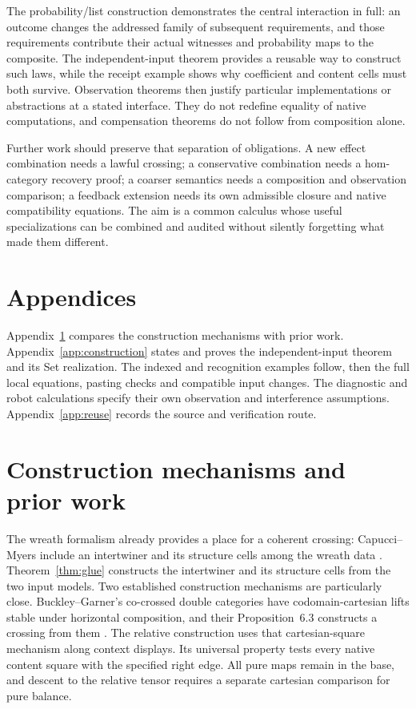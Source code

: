 \documentclass[11pt]{article}
\numberwithin{equation}{section}
\theoremstyle{definition}\newtheorem{definition}[theorem]{Definition}
\begin{document}
The probability/list construction demonstrates the central interaction in
full: an outcome changes the addressed family of subsequent requirements,
and those requirements contribute their actual witnesses and probability
maps to the composite. The independent-input theorem provides a reusable
way to construct such laws, while the receipt example shows why coefficient
and content cells must both survive. Observation theorems then justify
particular implementations or abstractions at a stated interface. They do
not redefine equality of native computations, and compensation theorems do
not follow from composition alone.

Further work should preserve that separation of obligations. A new effect
combination needs a lawful crossing; a conservative combination needs a
hom-category recovery proof; a coarser semantics needs a composition and
observation comparison; a feedback extension needs its own admissible
closure and native compatibility equations.
The aim is a common calculus whose useful specializations can be combined
and audited without silently forgetting what made them different.

\appendix
\section*{Appendices}
Appendix~\ref{app:credit} compares the construction mechanisms with prior work. Appendix~\ref{app:construction} states and proves the independent-input theorem and its Set realization. The indexed and recognition examples follow, then the full local equations, pasting checks and compatible input changes. The diagnostic and robot calculations specify their own observation and interference assumptions. Appendix~\ref{app:reuse} records the source and verification route.

\section{Construction mechanisms and prior work}\label{app:credit}
The wreath formalism already provides a place for a coherent crossing:
Capucci--Myers include an intertwiner and its structure cells among the
wreath data \cite[Def.~D.9]{CM}. Theorem~\ref{thm:glue} constructs the intertwiner and its structure cells
from the two input models. Two
established construction mechanisms are particularly close. Buckley--Garner's
co-crossed double categories have codomain-cartesian lifts stable under
horizontal composition, and their Proposition~6.3 constructs a crossing
from them \cite[Def.~6.1, Prop.~6.3 and Rem.~9.5]{BG}. The relative
construction uses that cartesian-square mechanism along context displays.
Its universal property tests every native content square with the
specified right edge. All pure maps remain in the base, and descent to
the relative tensor requires a separate cartesian comparison for pure
balance.
\end{document}
